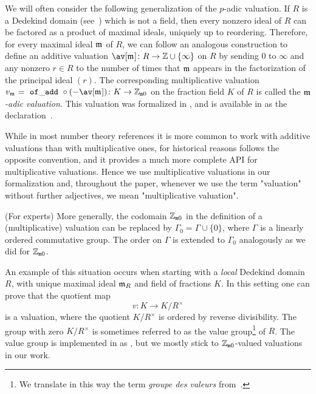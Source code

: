 \documentclass[sigplan,10pt,anonymous,review]{acmart}
\begin{document}
\begin{example}\label{example:adic_valuation}
We will often consider the following generalization of the $p$-adic valuation. If $R$ is a Dedekind domain (see~\cite[Chapitre~VII, \S2]{Bou85}) which is not a field, then every nonzero ideal of $R$ can be factored as a product of maximal ideals, uniquely up to reordering. Therefore, for every maximal ideal $\maxid[\empty]$ of $R$, we can follow an analogous construction to define an additive valuation $\av[{\maxid[\empty]}] \colon R \to \ZZ \cup \{ \infty\}$ on $R$ by sending $0$ to $\infty$ and any nonzero $r \in R$ to the number of times that $\mathfrak{m}$ appears in the factorization of the principal ideal $(r)$. The corresponding multiplicative valuation $v_{\maxid[\empty]}=\mcode{of\_add}\circ (-\av[{\maxid[\empty]}])\colon K \to \wzmZZ$ on the fraction field $K$ of $R$ is called the \emph{$\mathfrak{m}$-adic valuation}. This valuation was formalized in \cite{deF22}, and is available in \mathlib as the declaration~\href{https://leanprover-community.github.io/mathlib_docs/ring_theory/dedekind_domain/adic_valuation.html#is_dedekind_domain.height_one_spectrum.valuation}{\extlink}.
\end{example}

While in most number theory references it is more common to work with additive valuations than with multiplicative ones, for historical reasons \mathlib follows the opposite convention, and it provides a much more complete API for multiplicative valuations. Hence we use multiplicative valuations in our formalization and, throughout the paper, whenever we use the term "valuation" without further adjectives, we mean "multiplicative valuation".

\begin{remark}\label{rmk:value_group}(For experts)
More generally, the codomain $\mathbb{Z}_{\mathtt{m}0}$ in the definition of a (multiplicative) valuation can be replaced by $\Gamma_0=\Gamma\cup\{0\}$, where $\Gamma$ is a linearly ordered commutative group. The order on $\Gamma$ is extended to $\Gamma_0$ analogously as we did for $\mathbb{Z}_{\mathtt{m}0}$.
    
An example of this situation occurs when starting with a \emph{local} Dedekind domain $R$, with unique maximal ideal $\mathfrak{m}_{R}$ and field of fractions $K$. In this setting one can prove that the quotient map
 \[
v \colon K\rightarrow K/R^\times
\]
is a valuation, where the quotient $K/R^\times$ is ordered by reverse divisibility. The group with zero $K/R^\times$ is sometimes referred to as the value group\footnote{We translate in this way the term \emph{groupe des valeurs} from~\cite[Chapitre~VI, \S3, n$^\circ$2]{Bou85}.} of $R$. The value group is implemented in \mathlib as \href{https://leanprover-community.github.io/mathlib_docs/ring_theory/valuation/valuation_ring.html#valuation_ring.value_group}{\extlink}, but we mostly stick to $\mathbb{Z}_{\mathtt{m}0}$-valued valuations in our work.
\end{remark}
\end{document}

